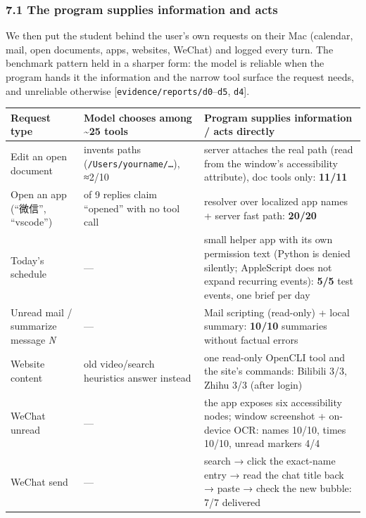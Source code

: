 \documentclass[
  10pt,
]{article}
\newcounter{none} %
\begin{document}
\subsubsection{7.1 The program supplies information and
acts}\label{the-program-supplies-information-and-acts}

We then put the student behind the user's own requests on their Mac
(calendar, mail, open documents, apps, websites, WeChat) and logged
every turn. The benchmark pattern held in a sharper form: the model is
reliable when the program hands it the information and the narrow tool
surface the request needs, and unreliable otherwise
{[}\texttt{evidence/reports/d0}--\texttt{d5}, \texttt{d4}{]}.

{\def\LTcaptype{none} %
\begin{longtable}[]{@{}
  >{\raggedright\arraybackslash}p{}
  >{\raggedright\arraybackslash}p{}
  >{\raggedright\arraybackslash}p{}@{}}
\toprule\noalign{}
\begin{minipage}[b]{\linewidth}\raggedright
Request type
\end{minipage} & \begin{minipage}[b]{\linewidth}\raggedright
Model chooses among \textasciitilde25 tools
\end{minipage} & \begin{minipage}[b]{\linewidth}\raggedright
Program supplies information / acts directly
\end{minipage} \\
\midrule\noalign{}
\endhead
\bottomrule\noalign{}
\endlastfoot
Edit an open document & invents paths (\texttt{/Users/yourname/…}),
≈2/10 & server attaches the real path (read from the window's
accessibility attribute), doc tools only: \textbf{11/11} \\
Open an app (``微信'', ``vscode'') & 5 of 9 replies claim ``opened''
with no tool call & resolver over localized app names + server fast
path: \textbf{20/20} \\
Today's schedule & --- & small helper app with its own permission text
(Python is denied silently; AppleScript does not expand recurring
events): \textbf{5/5} test events, one brief per day \\
Unread mail / summarize message \emph{N} & --- & Mail scripting
(read-only) + local summary: \textbf{10/10} summaries without factual
errors \\
Website content & old video/search heuristics answer instead & one
read-only OpenCLI tool and the site's commands: Bilibili 3/3, Zhihu 3/3
(after login) \\
WeChat unread & --- & the app exposes six accessibility nodes; window
screenshot + on-device OCR: names 10/10, times 10/10, unread markers
4/4 \\
WeChat send & --- & search → click the exact-name entry → read the chat
title back → paste → check the new bubble: 7/7 delivered \\
\end{longtable}
}
\end{document}
